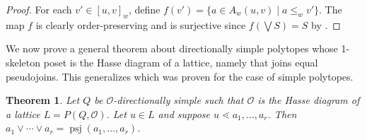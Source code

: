 \documentclass[12pt]{amsart}
\theoremstyle{plain}
\newtheorem{thm}{Theorem}[section]
\theoremstyle{definition}
\theoremstyle{remark}
\DeclareMathOperator{\psj}{psj}
\begin{document}
\begin{proof}
For each  $v'\in [u,v]_w$, define $f(v')=\{a \in A_w(u,v) \mid a \leq_w v'\}$. The map $f$ is clearly order-preserving and is surjective since $f(\bigvee S)=S$ by .  
\end{proof}

We now prove a general theorem about directionally simple polytopes whose 1-skeleton poset is the Hasse diagram of a lattice, namely that joins equal pseudojoins. This generalizes \cite[Thm.~4.7]{He} which was proven for the case of simple polytopes. 

\begin{thm}\label{thm:join-equals-pseudo}
Let $Q$ be $\mathcal{O}$-directionally simple such that $\mathcal{O}$ is the Hasse diagram of a lattice $L = P(Q,\mathcal{O})$. Let $u \in L$ and suppose $u \lessdot a_1,\ldots,a_r$. Then $a_1 \vee \cdots \vee a_r = \psj(a_1,\ldots,a_r)$.
\end{thm}
\end{document}
